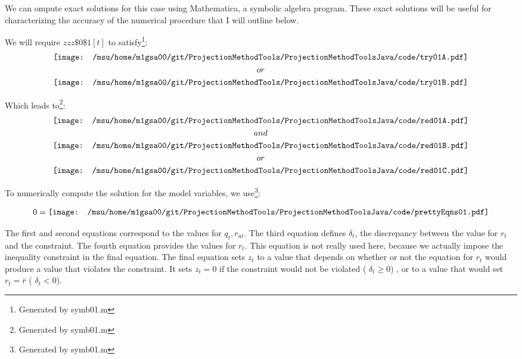 We can ompute exact solutions for this case using
Mathematica, a symbolic algebra program.  These exact 
solutions will be useful for
characterizing the accuracy of the numerical procedure that I will outline
below.

We will require $zzz\$0\$1[t]$ to satisfy\footnote{Generated by symb01.m}:
 \begin{gather*}
\vcenter{\hbox{\texttt{[image: /msu/home/m1gsa00/git/ProjectionMethodTools/ProjectionMethodToolsJava/code/try01A.pdf]}}}\\
or\\
\vcenter{\hbox{\texttt{[image: /msu/home/m1gsa00/git/ProjectionMethodTools/ProjectionMethodToolsJava/code/try01B.pdf]}}}\\
 \end{gather*}


Which leads to\footnote{Generated by symb01.m}:
 \begin{gather*}
\vcenter{\hbox{\texttt{[image: /msu/home/m1gsa00/git/ProjectionMethodTools/ProjectionMethodToolsJava/code/red01A.pdf]}}}\\
and\\
\vcenter{\hbox{\texttt{[image: /msu/home/m1gsa00/git/ProjectionMethodTools/ProjectionMethodToolsJava/code/red01B.pdf]}}}\\
or\\
\vcenter{\hbox{\texttt{[image: /msu/home/m1gsa00/git/ProjectionMethodTools/ProjectionMethodToolsJava/code/red01C.pdf]}}}
 \end{gather*}



To numerically compute the solution for the model variables, we use\footnote{Generated by symb01.m}:

\begin{gather*}
  0=\vcenter{\hbox{\texttt{[image: /msu/home/m1gsa00/git/ProjectionMethodTools/ProjectionMethodToolsJava/code/prettyEqns01.pdf]}}}
\end{gather*}

The first and second equations correspond to the values for $q_t,r_{ut}$.
The third equation defines $\delta_t$, the discrepancy between the value for $r_t$ and the constraint.    The fourth equation provides the values for $r_t$.  This equation is not really used here, because we actually impose the inequality
constraint in the final equation. The final equation
 sets $z_t$ to a value that depends on 
whether or not the equation for $r_t$ would produce a value that violates the
constraint.  It sets $z_t=0$ if the constraint would  not be violated ( $\delta_t\ge0$) ,  or
to a value that would set $r_t=\bar{r}$ ( $\delta_t<0$).


